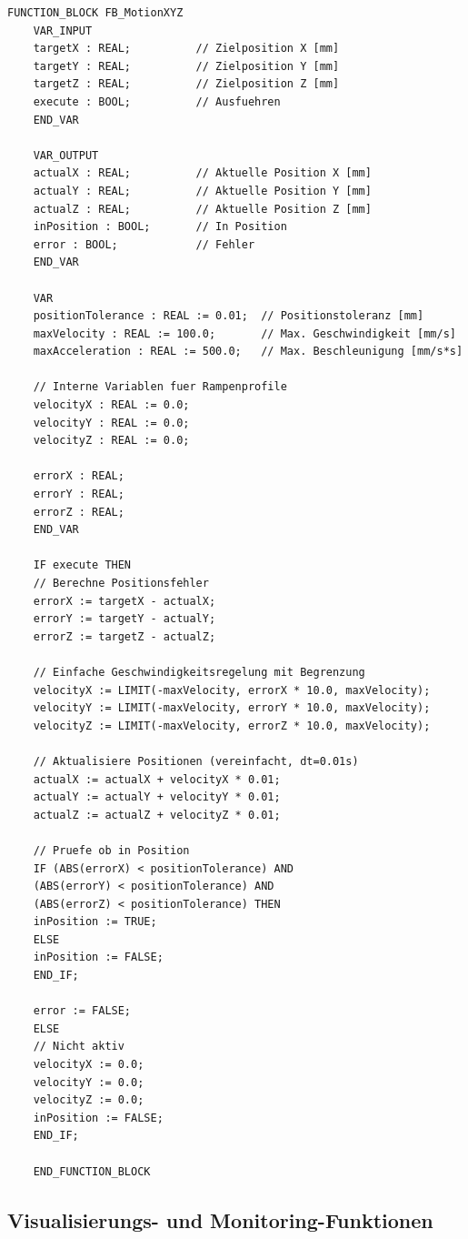 ﻿\documentclass[12pt,a4paper]{article}
\begin{document}
\begin{lstlisting}[style=structuredtext, caption={Funktionsbaustein fÃ¼r XYZ-Bewegungssteuerung}, label={lst:motion}]
	FUNCTION_BLOCK FB_MotionXYZ
	VAR_INPUT
	targetX : REAL;          // Zielposition X [mm]
	targetY : REAL;          // Zielposition Y [mm]
	targetZ : REAL;          // Zielposition Z [mm]
	execute : BOOL;          // Ausfuehren
	END_VAR
	
	VAR_OUTPUT
	actualX : REAL;          // Aktuelle Position X [mm]
	actualY : REAL;          // Aktuelle Position Y [mm]
	actualZ : REAL;          // Aktuelle Position Z [mm]
	inPosition : BOOL;       // In Position
	error : BOOL;            // Fehler
	END_VAR
	
	VAR
	positionTolerance : REAL := 0.01;  // Positionstoleranz [mm]
	maxVelocity : REAL := 100.0;       // Max. Geschwindigkeit [mm/s]
	maxAcceleration : REAL := 500.0;   // Max. Beschleunigung [mm/s*s]
	
	// Interne Variablen fuer Rampenprofile
	velocityX : REAL := 0.0;
	velocityY : REAL := 0.0;
	velocityZ : REAL := 0.0;
	
	errorX : REAL;
	errorY : REAL;
	errorZ : REAL;
	END_VAR
	
	IF execute THEN
	// Berechne Positionsfehler
	errorX := targetX - actualX;
	errorY := targetY - actualY;
	errorZ := targetZ - actualZ;
	
	// Einfache Geschwindigkeitsregelung mit Begrenzung
	velocityX := LIMIT(-maxVelocity, errorX * 10.0, maxVelocity);
	velocityY := LIMIT(-maxVelocity, errorY * 10.0, maxVelocity);
	velocityZ := LIMIT(-maxVelocity, errorZ * 10.0, maxVelocity);
	
	// Aktualisiere Positionen (vereinfacht, dt=0.01s)
	actualX := actualX + velocityX * 0.01;
	actualY := actualY + velocityY * 0.01;
	actualZ := actualZ + velocityZ * 0.01;
	
	// Pruefe ob in Position
	IF (ABS(errorX) < positionTolerance) AND 
	(ABS(errorY) < positionTolerance) AND 
	(ABS(errorZ) < positionTolerance) THEN
	inPosition := TRUE;
	ELSE
	inPosition := FALSE;
	END_IF;
	
	error := FALSE;
	ELSE
	// Nicht aktiv
	velocityX := 0.0;
	velocityY := 0.0;
	velocityZ := 0.0;
	inPosition := FALSE;
	END_IF;
	
	END_FUNCTION_BLOCK
\end{lstlisting}

\subsection{Visualisierungs- und Monitoring-Funktionen}
\end{document}
